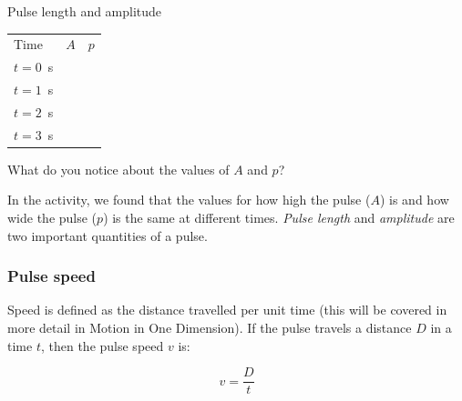 \begin{Investigation}{Pulse length and amplitude }
\begin{table}[H]
\begin{center}
\begin{xtabular}[t]{|l|l|l|}
        Time &
                  $A$
                 &
                  $p$
     \tabularnewline{}
        $t=0$~s &
         &
     \tabularnewline{}
        $t=1$~s &
         &
     \tabularnewline{}
        $t=2$~s &
         &
     \tabularnewline{}
        $t=3$~s &
         &
     \tabularnewline{}
    \end{xtabular}
      \end{center}
\end{table}
    \par
        \label{m38801*id313222}What do you notice about the values of $A$ and $p$?
 \par 
        \label{m38801*id313246}In the activity, we found that the values for how high the pulse ($A$) is and how wide the pulse ($p$) is the same at different times. \textsl{Pulse length} and \textsl{amplitude} are two important quantities of a pulse.\par 
      \label{m38801*uid3}

\end{Investigation}

            \subsubsection*{Pulse speed}
            \nopagebreak

        
\label{m38801*id313303}Speed is defined as the distance travelled per unit time (this will be covered in more detail in Motion in One Dimension). If the pulse travels a distance $D$ in a time $t$, then the pulse speed $v$ is:\par 
        \label{m38801*uid4}\nopagebreak\noindent{}
    \begin{equation}
    \boxed{v=\frac{D}{t}}\nonumber
      \end{equation}

